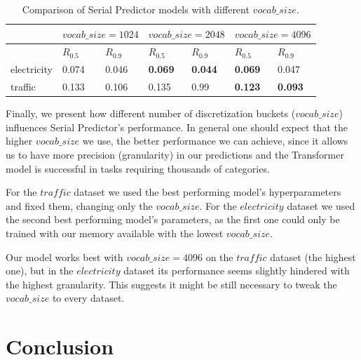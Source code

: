 \documentclass[en]{pracamgr}
\begin{document}
	\begin{table}[h]
		\begin{center}
			\begin{tabular}
				{ |p{2cm}|p{1.5cm}|p{1.5cm}||p{1.5cm}|p{1.5cm}||p{1.5cm}|p{1.5cm}|   }
				\hline
				& \multicolumn{2}{c||}{$vocab\_size=1024$} & \multicolumn{2}{|c|}{$vocab\_size=2048$} & \multicolumn{2}{|c|}{$vocab\_size=4096$} \\
				\hline
				& \hfil $R_{0.5}$ & \hfil $R_{0.9}$ & \hfil $R_{0.5}$ & \hfil $R_{0.9} $ & \hfil $R_{0.5}$ & \hfil $R_{0.9} $
				\\
				\hline
				electricity & \hfil 0.074   & \hfil 0.046    & \hfil \textbf{0.069} &   \hfil \textbf{0.044} & \hfil \textbf{0.069} &   \hfil 0.047 \\
				
				traffic &  \hfil 0.133 &   \hfil 0.106 & \hfil 0.135 &   \hfil 0.99 & \textbf{\hfil 0.123} &   \hfil \textbf{0.093} \\
				\hline
			\end{tabular}
			\caption{\label{tab:results}Comparison of Serial Predictor models with different $vocab\_size$.}
		\end{center}
	\end{table}
	
	Finally, we present how different number of discretization buckets ($vocab\_size$) influences Serial Predictor's performance. In general one should expect that the higher $vocab\_size$ we use, the better performance we can achieve, since it allows us to have more precision (granularity) in our predictions and the Transformer model is successful in tasks requiring thousands of categories.
	
	For the $traffic$ dataset we used the best performing model's hyperparameters and fixed them, changing only the $vocab\_size$. For the $electricity$ dataset we used the second best performing model's parameters, as the first one could only be trained with our memory available with the lowest $vocab\_size$. 
	
	
	Our model works best with $vocab\_size = 4096$ on the $traffic$ dataset (the highest one), but in the $electricity$ dataset its performance seems slightly hindered with the highest granularity. This suggests it might be still necessary to tweak the $vocab\_size$ to every dataset.
	
	
	
	
	\chapter{Conclusion}
	
\end{document}
